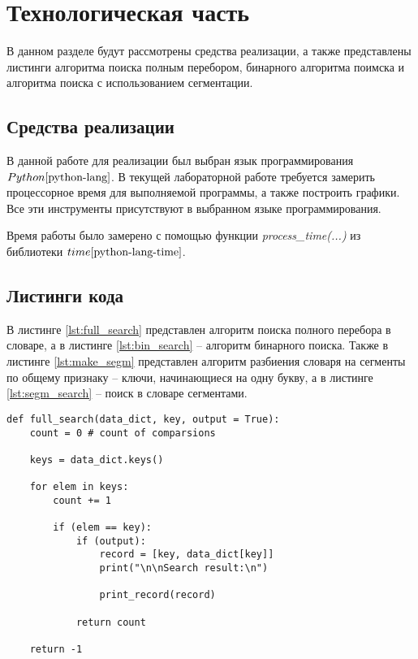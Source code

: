 \chapter{Технологическая часть}

В данном разделе будут рассмотрены средства реализации, а также представлены листинги алгоритма поиска полным перебором, бинарного алгоритма поимска и алгоритма поиска с использованием сегментации.

\section{Средства реализации}
В данной работе для реализации был выбран язык программирования $Python \cite{python-lang}$. В текущей лабораторной работе требуется замерить процессорное время для выполняемой программы, а также построить графики. Все эти инструменты присутствуют в выбранном языке программирования.

Время работы было замерено с помощью функции \textit{process\_time(...)} из библиотеки $time \cite{python-lang-time}$.


\section{Листинги кода}

В листинге \ref{lst:full_search} представлен алгоритм поиска полного перебора в словаре, а в листинге \ref{lst:bin_search} -- алгоритм бинарного поиска. Также в листинге \ref{lst:make_segm} представлен алгоритм разбиения словаря на сегменты по общему признаку -- 
ключи, начинающиеся на одну букву, а в листинге \ref{lst:segm_search} -- поиск в словаре сегментами.

\clearpage

\begin{center}
    \captionsetup{justification=raggedright,singlelinecheck=off}
    \begin{lstlisting}[label=lst:full_search,caption=Алгоритм поиска в словаре полным перебором]
def full_search(data_dict, key, output = True):
	count = 0 # count of comparsions

	keys = data_dict.keys()

	for elem in keys:
		count += 1

		if (elem == key):
			if (output):
				record = [key, data_dict[key]]
				print("\n\nSearch result:\n")
						
				print_record(record)
				
			return count

	return -1
\end{lstlisting}
\end{center}

